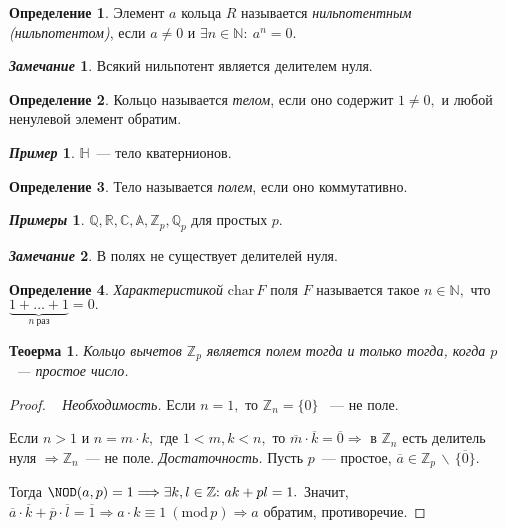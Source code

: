 \documentclass[a4paper, 14pt]{extarticle}
\newcommand{\n}{\par}
\newcommand{\integers}{\mathbb{Z}}
\newcommand{\naturals}{\mathbb{N}}
\newcommand{\rationals}{\mathbb{Q}}
\newcommand{\real}{\mathbb{R}}
\newcommand{\complex}{\mathbb{C}}
\newcommand{\algebraic}{\mathbb{A}}
\newcommand{\suchthat}{{:}{ } \ }
\renewcommand{\mod}{\mathrm{mod} \,}
\theoremstyle{definition}
\newtheorem*{exmpl*}{\textit{Пример}}
\newtheorem*{exmpls}{\textit{Примеры}}
\newtheorem*{remark}{\textit{Замечание}}
\newtheorem{definition}{Определение}
\theoremstyle{plain}
\newtheorem{theorem}{Теоерма}
\numberwithin{theorem}{section}
\numberwithin{definition}{section}
\numberwithin{statement}{section}
\numberwithin{lemma}{section}
\numberwithin{consequence}{section}
\begin{document}
	\begin{definition}
		Элемент $a$ кольца $R$ называется \textit{нильпотентным (нильпотентом)}, если ${a \neq 0}$ и ${\exists n \in \naturals \suchthat a^n = 0.}$
	\end{definition}
	\begin{remark}
		Всякий нильпотент является делителем нуля.
	\end{remark}
	\begin{definition}
		Кольцо называется \textit{телом}, если оно содержит ${1 \neq 0,}$ и любой ненулевой элемент обратим.
        \begin{exmpl*}
            $\mathbb{H}$~--- тело кватернионов.
        \end{exmpl*}
	\end{definition}
        \begin{definition}
            Тело называется \textit{полем}, если оно коммутативно.
        \end{definition}
        \begin{exmpls}
		$\rationals, \real, \complex, \algebraic, \integers_p, \rationals_p$ для простых $p$.
	\end{exmpls}
	\begin{remark}
		В полях не существует делителей нуля.
	\end{remark}
        \begin{definition}
            \textit{Характеристикой} $\mathrm{char} \, F$ поля $F$ называется такое ${n \in \naturals,}$ что ${\underbrace{1+\ldots+1}_{n \ \text{раз}} = 0.}$
        \end{definition}
        \newpage
	\begin{theorem}
		Кольцо вычетов  $\integers_p$ является полем тогда и только тогда, когда $p$~--- простое число.
	\end{theorem}
	\begin{proof}
		\
		\newline
		{\textit{Необходимость.}} Если ${n = 1,}$ то ${\integers_n = \{0\}}$ ~--- не поле. \n
		Если ${n > 1}$ и ${n = m \cdot k,}$  где ${1 < m, k < n,}$ то ${\overline{m} \cdot \overline{k} = \overline{0}} \Longrightarrow$ в $\integers_n$ есть делитель нуля ${\Longrightarrow \integers_n}$~--- не поле. \newline
		{\textit{Достаточность.}} Пусть $p$~--- простое, ${\overline{a} \in \integers_p \, \backslash \, \{\overline{0}\}.}$ \n
		Тогда ${{\NOD(a,p)} = 1} \Longrightarrow {\exists k,l \in \integers \suchthat ak + pl = 1.}$ Значит, ${\overline{a} \cdot \overline{k} + \overline{p} \cdot \overline{l} = \overline{1} \Longrightarrow a \cdot k \equiv 1 \ (\mod p) \Longrightarrow a}$ обратим, противоречие.
	\end{proof}
\end{document}
